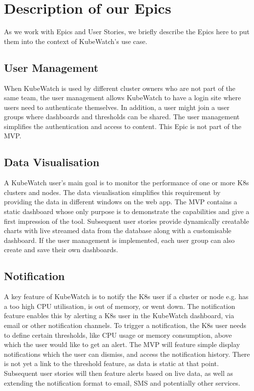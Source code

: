\section{Description of our Epics}

As we work with Epics and User Stories, we briefly describe the Epics here to put them into the context of KubeWatch's use case.

\subsection{User Management}
When KubeWatch is used by different cluster owners who are not part of the same team, the user management allows KubeWatch to have a login site where users need to authenticate themselves. In addition, a user might join a user groups where dashboards and thresholds can be shared. The user management simplifies the authentication and access to content. This Epic is not part of the MVP.

\subsection{Data Visualisation}
A KubeWatch user's main goal is to monitor the performance of one or more K8s clusters and nodes. The data visualisation simplifies this requirement by providing the data in different windows on the web app. The MVP contains a static dashboard whose only purpose is to demonstrate the capabilities and give a first impression of the tool. Subsequent user stories provide dynamically creatable charts with live streamed data from the database along with a customisable dashboard. If the user management is implemented, each user group can also create and save their own dashboards.

\subsection{Notification}
A key feature of KubeWatch is to notify the K8s user if a cluster or node e.g. has a too high CPU utilisation, is out of memory, or went down. The notification feature enables this by alerting a K8s user in the KubeWatch dashboard, via email or other notification channels. To trigger a notification, the K8s user needs to define certain thresholds, like CPU usage or memory consumption, above which the user would like to get an alert. The MVP will feature simple display notifications which the user can dismiss, and access the notification history. There is not yet a link to the threshold feature, as data is static at that point. Subsequent user stories will then feature alerts based on live data, as well as extending the notification format to email, SMS and potentially other services.

